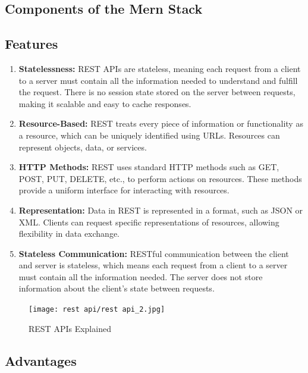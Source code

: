 \documentclass[11pt]{article}
\begin{document}
\subsection{Components of the Mern Stack}
\subsection{Features}

\begin{enumerate}
    \item \textbf{Statelessness:} REST APIs are stateless, meaning each request from a client to a server must contain all the information needed to understand and fulfill the request. There is no session state stored on the server between requests, making it scalable and easy to cache responses.

    \item \textbf{Resource-Based:} REST treats every piece of information or functionality as a resource, which can be uniquely identified using URLs. Resources can represent objects, data, or services.

    \item \textbf{HTTP Methods:} REST uses standard HTTP methods such as GET, POST, PUT, DELETE, etc., to perform actions on resources. These methods provide a uniform interface for interacting with resources.

    \item \textbf{Representation:} Data in REST is represented in a format, such as JSON or XML. Clients can request specific representations of resources, allowing flexibility in data exchange.

    \item \textbf{Stateless Communication:} RESTful communication between the client and server is stateless, which means each request from a client to a server must contain all the information needed. The server does not store information about the client's state between requests.

\end{enumerate}
\begin{figure}[H]
    \centering
    \texttt{[image: rest api/rest api\_2.jpg]}
    \caption{REST APIs Explained}
\end{figure}


\subsection{Advantages}
\end{document}
